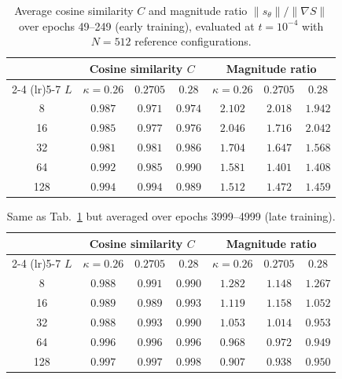 \documentclass[reprint,twocolumn,superscriptaddress,preprintnumbers,amsmath,amssymb,aps,prd,floatfix]{revtex4-2}
\def\Tab#1{Tab.~\ref{#1}}
\begin{document}
\begin{table}[t]
\centering
\caption{Average cosine similarity $C$ and magnitude ratio $\|s_\theta\|/\|\nabla S\|$ over epochs 49--249 (early training), evaluated at $t=10^{-4}$ with $N=512$ reference configurations.}
\label{tab:score_early}
\begin{tabular}{ccccccc}
\toprule
 & \multicolumn{3}{c}{Cosine similarity $C$} & \multicolumn{3}{c}{Magnitude ratio} \\
\cmidrule(lr){2-4} \cmidrule(lr){5-7}
$L$ & $\kappa\!=\!0.26$ & $0.2705$ & $0.28$ & $\kappa\!=\!0.26$ & $0.2705$ & $0.28$ \\
\midrule
8   & $0.987$ & $0.971$ & $0.974$ & $2.102$ & $2.018$ & $1.942$ \\
16  & $0.985$ & $0.977$ & $0.976$ & $2.046$ & $1.716$ & $2.042$ \\
32  & $0.981$ & $0.981$ & $0.986$ & $1.704$ & $1.647$ & $1.568$ \\
64  & $0.992$ & $0.985$ & $0.990$ & $1.581$ & $1.401$ & $1.408$ \\
128 & $0.994$ & $0.994$ & $0.989$ & $1.512$ & $1.472$ & $1.459$ \\
\bottomrule
\end{tabular}
\end{table}

\begin{table}[t]
\centering
\caption{Same as \Tab{tab:score_early} but averaged over epochs 3999--4999 (late training).}
\label{tab:score_late}
\begin{tabular}{ccccccc}
\toprule
 & \multicolumn{3}{c}{Cosine similarity $C$} & \multicolumn{3}{c}{Magnitude ratio} \\
\cmidrule(lr){2-4} \cmidrule(lr){5-7}
$L$ & $\kappa\!=\!0.26$ & $0.2705$ & $0.28$ & $\kappa\!=\!0.26$ & $0.2705$ & $0.28$ \\
\midrule
8   & $0.988$ & $0.991$ & $0.990$ & $1.282$ & $1.148$ & $1.267$ \\
16  & $0.989$ & $0.989$ & $0.993$ & $1.119$ & $1.158$ & $1.052$ \\
32  & $0.988$ & $0.993$ & $0.990$ & $1.053$ & $1.014$ & $0.953$ \\
64  & $0.996$ & $0.996$ & $0.996$ & $0.968$ & $0.972$ & $0.949$ \\
128 & $0.997$ & $0.997$ & $0.998$ & $0.907$ & $0.938$ & $0.950$ \\
\bottomrule
\end{tabular}
\end{table}
\end{document}
